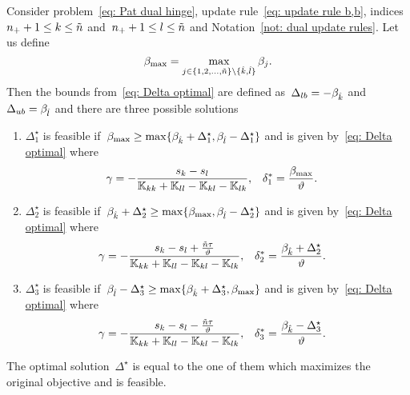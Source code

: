 \begin{lemma}\label{thm: patmat family hinge update b,b}
  Consider problem~\eqref{eq: Pat dual hinge}, update rule~\eqref{eq: update rule b,b}, indices~$n_{+} + 1 \leq k \leq \tilde{n}$ and~$n_{+} + 1 \leq l \leq \tilde{n}$ and Notation~\ref{not: dual update rules}. Let us define
  \begin{equation*}
    \beta_{\max} = \max_{j \in \{1, 2, \ldots, \tilde{n} \} \setminus \{\hat{k}, \hat{l}\}} \beta_j.
  \end{equation*}
  Then the bounds from~\eqref{eq: Delta optimal} are defined as~$\Delta_{lb} = - \beta_{\hat{k}}$ and~$\Delta_{ub} = \beta_{\hat{l}}$ and there are three possible solutions
  \begin{enumerate}
    \item $\Delta^{\star}_1$ is feasible if~$\beta_{\max} \geq \max\{\beta_{\hat{k}} + \Delta^{\star}_1, \beta_{\hat{l}} - \Delta^{\star}_1\}$ and is given by~\eqref{eq: Delta optimal} where
    \begin{align*}
      \gamma
        & = -\frac{s_k - s_l}{\mathbb{K}_{kk} + \mathbb{K}_{ll} - \mathbb{K}_{kl} - \mathbb{K}_{lk}}, &
      \delta^{*}_1
        & = \frac{\beta_{\max}}{\vartheta}.
    \end{align*}
    \item $\Delta^{\star}_2$ is feasible if~$\beta_{\hat{k}} + \Delta^{\star}_2 \geq \max\{\beta_{\max} , \beta_{\hat{l}} - \Delta^{\star}_2\}$ and is given by~\eqref{eq: Delta optimal} where
    \begin{align*}
      \gamma
        & = -\frac{s_k - s_l + \frac{\tilde{n} \tau}{\vartheta}}{\mathbb{K}_{kk} + \mathbb{K}_{ll} - \mathbb{K}_{kl} - \mathbb{K}_{lk}}, &
      \delta^{*}_2
        & = \frac{\beta_{\hat{k}} + \Delta^{\star}_2}{\vartheta}.
    \end{align*}
    \item $\Delta^{\star}_3$ is feasible if~$\beta_{\hat{l}} - \Delta^{\star}_3 \geq \max\{\beta_{\hat{k}} + \Delta^{\star}_3, \beta_{\max}\}$ and is given by~\eqref{eq: Delta optimal} where
    \begin{align*}
      \gamma
        & = -\frac{s_k - s_l - \frac{\tilde{n} \tau}{\vartheta}}{\mathbb{K}_{kk} + \mathbb{K}_{ll} - \mathbb{K}_{kl} - \mathbb{K}_{lk}}, &
      \delta^{*}_3
        & = \frac{\beta_{\hat{k}} - \Delta^{\star}_3}{\vartheta}.
    \end{align*}
  \end{enumerate}
  The optimal solution~$\Delta^{\star}$ is equal to the one of them which maximizes the original objective and is feasible.
\end{lemma}

